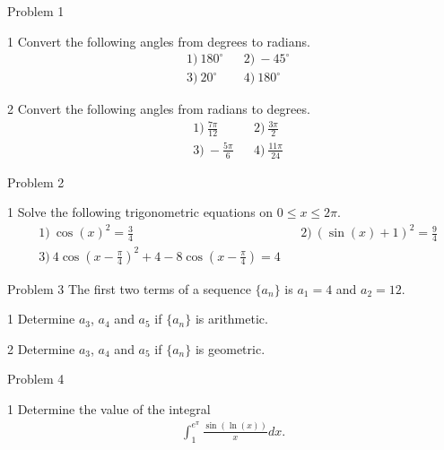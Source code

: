 \documentclass[12pt,x11names,a4paper]{article}
\begin{document}
\begin{opgavetekst}{Problem 1}
\end{opgavetekst}
%
%
\begin{delopgave}{1}
	Convert the following angles from degrees to radians.
	\begin{align*}
		&1) \ 180^\circ & &2) \ -45^\circ\\
		&3) \ 20^\circ & &4) \ 180^\circ 
	\end{align*}
\end{delopgave}
\begin{delopgave}{2}
	Convert the following angles from radians to degrees.
	\begin{align*}
		&1) \ \frac{7\pi}{12} & &2) \ \frac{3\pi}{2}\\
		&3) \ -\frac{5\pi}{6} & &4) \ \frac{11\pi}{24} 
	\end{align*}
\end{delopgave}
%
%
%
%
%
\begin{opgavetekst}{Problem 2}
\end{opgavetekst}
%
%
\begin{delopgave}{1}
	Solve the following trigonometric equations on $0 \leq x \leq 2\pi$. 
	\begin{align*}
		&1) \ \cos(x)^2 = \frac{3}{4} & &2) \ (\sin(x)+1)^2 = \frac{9}{4}\\
		&3) \ 4\cos\left(x-\frac{\pi}{4}\right)^2+4 - 8\cos\left(x-\frac{\pi}{4}\right) = 4 
	\end{align*}
\end{delopgave}
%
%
%
%
%
\begin{opgavetekst}{Problem 3}
	The first two terms of a sequence $\{a_n\}$ is $a_1 = 4$ and $a_2 = 12$.  
\end{opgavetekst}
\begin{delopgave}{1}
	Determine $a_3$, $a_4$ and $a_5$ if $\{a_n\}$ is arithmetic. 
\end{delopgave}
\begin{delopgave}{2}
	Determine $a_3$, $a_4$ and $a_5$ if $\{a_n\}$ is geometric. 
\end{delopgave}
%
%
%
%
%
\begin{opgavetekst}{Problem 4}
\end{opgavetekst}
\begin{delopgave}{1}
	Determine the value of the integral
	\begin{align*}
		\int_1^{e^{\pi}} \frac{\sin(\ln(x))}{x} dx.
	\end{align*}
\end{delopgave}
\end{document}
